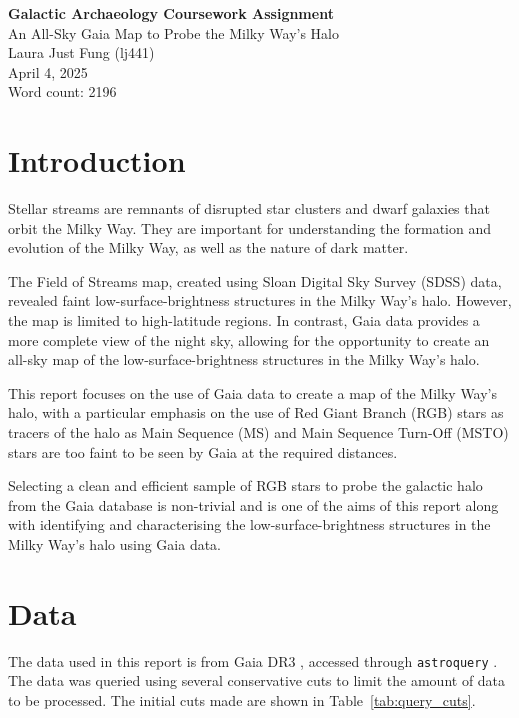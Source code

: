 \documentclass[11pt,a4paper]{article}
\begin{document}
 

\begin{center}
    \LARGE{\textbf{Galactic Archaeology Coursework Assignment}}
    \\
    \Large{{An All-Sky Gaia Map to Probe the Milky Way's Halo}}
    \\
    \large{Laura Just Fung (lj441)}
    \\
    April 4, 2025
    \\
    Word count: 2196
\end{center}

\section{Introduction}
Stellar streams are remnants of disrupted star clusters and dwarf galaxies that orbit the Milky Way. They are important for understanding the formation and evolution of the Milky Way, as well as the nature of dark matter. 

The Field of Streams map, created using Sloan Digital Sky Survey (SDSS) data, revealed faint low-surface-brightness structures in the Milky Way's halo. However, the map is limited to high-latitude regions. In contrast, Gaia data provides a more complete view of the night sky, allowing for the opportunity to create an all-sky map of the low-surface-brightness structures in the Milky Way's halo. 

This report focuses on the use of Gaia data to create a map of the Milky Way's halo, with a particular emphasis on the use of Red Giant Branch (RGB) stars as tracers of the halo as Main Sequence (MS) and Main Sequence Turn-Off (MSTO) stars are too faint to be seen by Gaia at the required distances. 

Selecting a clean and efficient sample of RGB stars to probe the galactic halo from the Gaia database is non-trivial and is one of the aims of this report along with identifying and characterising the low-surface-brightness structures in the Milky Way's halo using Gaia data. 

\section{Data}
\label{sec:data}
The data used in this report is from Gaia DR3 \citep{2016A&A...595A...1G, 2023Gaia}, accessed through \texttt{astroquery} \citep{2019AJ....157...98G}. The data was queried using several conservative cuts to limit the amount of data to be processed. The initial cuts made are shown in Table~\ref{tab:query_cuts}.
\end{document}
